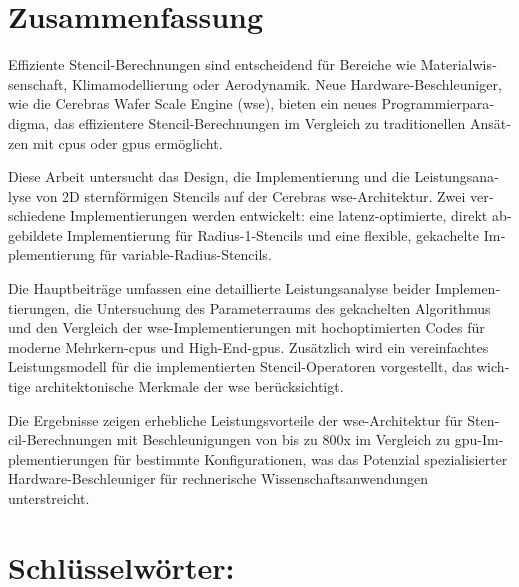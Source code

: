 \begin{otherlanguage}{ngerman}
\section*{Zusammenfassung}
Effiziente Stencil-Berechnungen sind entscheidend für Bereiche wie Materialwissenschaft, Klimamodellierung oder Aerodynamik. Neue Hardware-Beschleuniger, wie die Cerebras Wafer Scale Engine (\ac{wse}), bieten ein neues Programmierparadigma, das effizientere Stencil-Berechnungen im Vergleich zu traditionellen Ansätzen mit \acp{cpu} oder \acp{gpu} ermöglicht.

Diese Arbeit untersucht das Design, die Implementierung und die Leistungsanalyse von 2D sternförmigen Stencils auf der Cerebras \ac{wse}-Architektur. Zwei verschiedene Implementierungen werden entwickelt: eine latenz-optimierte, direkt abgebildete Implementierung für Radius-1-Stencils und eine flexible, gekachelte Implementierung für variable-Radius-Stencils.

Die Hauptbeiträge umfassen eine detaillierte Leistungsanalyse beider Implementierungen, die Untersuchung des Parameterraums des gekachelten Algorithmus und den Vergleich der \ac{wse}-Implementierungen mit hochoptimierten Codes für moderne Mehrkern-\acp{cpu} und High-End-\acp{gpu}. Zusätzlich wird ein vereinfachtes Leistungsmodell für die implementierten Stencil-Operatoren vorgestellt, das wichtige architektonische Merkmale der \ac{wse} berücksichtigt.

Die Ergebnisse zeigen erhebliche Leistungsvorteile der \ac{wse}-Architektur für Stencil-Berechnungen mit Beschleunigungen von bis zu 800x im Vergleich zu \ac{gpu}-Implementierungen für bestimmte Konfigurationen, was das Potenzial spezialisierter Hardware-Beschleuniger für rechnerische Wissenschaftsanwendungen unterstreicht.

\section*{Schlüsselwörter:} \itshape \germankeywords
\end{otherlanguage}
